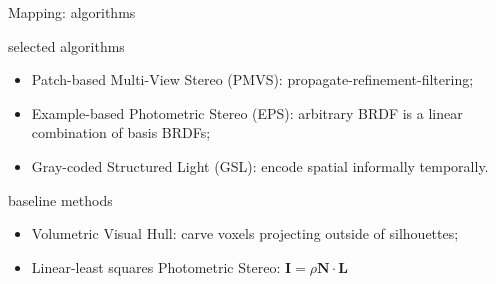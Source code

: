 \documentclass[10pt]{beamer}
\begin{document}
\begin{frame}{Mapping: algorithms}

\begin{exampleblock}{selected algorithms}
\begin{itemize}
\item Patch-based Multi-View Stereo (PMVS): propagate-refinement-filtering;
\item Example-based Photometric Stereo (EPS): arbitrary BRDF is a linear combination of basis BRDFs;
\item Gray-coded Structured Light (GSL): encode spatial informally temporally.
\end{itemize}
\end{exampleblock}

\begin{exampleblock}{baseline methods}
\begin{itemize}
\item Volumetric Visual Hull: carve voxels projecting outside of silhouettes;
\item Linear-least squares Photometric Stereo: $\mathbf{I}=\rho\mathbf{N}\cdot\mathbf{L}$
\end{itemize}
\end{exampleblock}

\end{frame}
\end{document}
